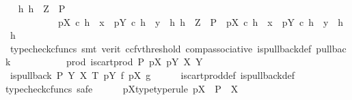 \begin{isabellebody}
\ \isamarkupfalse%
\ {\isachardoublequoteopen}{\isasymexists}h{\isachardot}{\kern0pt}\ h\ {\isacharcolon}{\kern0pt}\ Z\ {\isasymrightarrow}\ P\ {\isasymand}\isanewline
\ \ \ \ \ \ \ \ \ \ \ pX\ {\isasymcirc}\isactrlsub c\ h\ {\isacharequal}{\kern0pt}\ x\ {\isasymand}\ pY\ {\isasymcirc}\isactrlsub c\ h\ {\isacharequal}{\kern0pt}\ y\ {\isasymand}\ {\isacharparenleft}{\kern0pt}{\isasymforall}h{}{\isachardot}{\kern0pt}\ h{}\ {\isacharcolon}{\kern0pt}\ Z\ {\isasymrightarrow}\ P\ {\isasymand}\ pX\ {\isasymcirc}\isactrlsub c\ h{}\ {\isacharequal}{\kern0pt}\ x\ {\isasymand}\ pY\ {\isasymcirc}\isactrlsub c\ h{}\ {\isacharequal}{\kern0pt}\ y\ {\isasymlongrightarrow}\ h{}\ {\isacharequal}{\kern0pt}\ h{\isacharparenright}{\kern0pt}{\isachardoublequoteclose}\isanewline
\ \ \ \ \ \ \ \ \isamarkupfalse%
\ {\isacharparenleft}{\kern0pt}typecheck{\isacharunderscore}{\kern0pt}cfuncs{\isacharcomma}{\kern0pt}\ smt\ {\isacharparenleft}{\kern0pt}verit{\isacharcomma}{\kern0pt}\ ccfv{\isacharunderscore}{\kern0pt}threshold{\isacharparenright}{\kern0pt}\ comp{\isacharunderscore}{\kern0pt}associative{}\ is{\isacharunderscore}{\kern0pt}pullback{\isacharunderscore}{\kern0pt}def\ pullback{\isacharparenright}{\kern0pt}\isanewline
\ \ \ \ \isamarkupfalse%
\isanewline
\ \ \isamarkupfalse%
\isanewline
{}\isamarkupfalse%
\isanewline
\ \ \isamarkupfalse%
\ prod{\isacharcolon}{\kern0pt}\ {\isachardoublequoteopen}is{\isacharunderscore}{\kern0pt}cart{\isacharunderscore}{\kern0pt}prod\ P\ pX\ pY\ X\ Y{\isachardoublequoteclose}\isanewline
\ \ \isamarkupfalse%
\ \isamarkupfalse%
\ {\isachardoublequoteopen}is{\isacharunderscore}{\kern0pt}pullback\ P\ Y\ X\ T\ pY\ f\ pX\ g{\isachardoublequoteclose}\isanewline
\ \ \ \ \isamarkupfalse%
\ is{\isacharunderscore}{\kern0pt}cart{\isacharunderscore}{\kern0pt}prod{\isacharunderscore}{\kern0pt}def\ is{\isacharunderscore}{\kern0pt}pullback{\isacharunderscore}{\kern0pt}def\isanewline
\ \ \isamarkupfalse%
{\isacharparenleft}{\kern0pt}typecheck{\isacharunderscore}{\kern0pt}cfuncs{\isacharcomma}{\kern0pt}\ safe{\isacharparenright}{\kern0pt}\isanewline
\ \ \ \ \isamarkupfalse%
\ pX{\isacharunderscore}{\kern0pt}type{\isacharbrackleft}{\kern0pt}type{\isacharunderscore}{\kern0pt}rule{\isacharbrackright}{\kern0pt}{\isacharcolon}{\kern0pt}\ {\isachardoublequoteopen}pX\ {\isacharcolon}{\kern0pt}\ P\ {\isasymrightarrow}\ X{\isachardoublequoteclose}\isanewline

\end{isabellebody}
